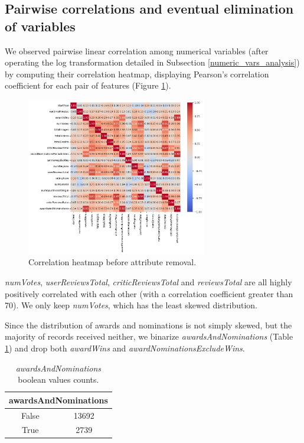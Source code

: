 \subsection{Pairwise correlations and eventual elimination of variables}
We observed pairwise linear correlation among numerical variables (after operating the log transformation detailed in Subsection \ref{numeric_vars_analysis}) by computing their correlation heatmap, displaying Pearson’s correlation coefficient for each pair of features (Figure \ref{fig:heatmap_first.png}).

\begin{figure}
    \centering
    \includegraphics[width=0.7\textwidth]{../../results/images/heatmap_first.png}
    \caption{Correlation heatmap before attribute removal.}
    \label{fig:heatmap_first.png}
\end{figure}


\textit{numVotes}, \textit{userReviewsTotal}, \textit{criticReviewsTotal} and \textit{reviewsTotal} are all highly positively correlated with each other (with a correlation coefficient greater than 70). We only keep \textit{numVotes}, which has the least skewed distribution.

Since the distribution of awards and nominations is not simply skewed, but the majority of records received neither, we binarize \textit{awardsAndNominations} (Table \ref{tab:awards_nominations_bool}) and drop both \textit{awardWins} and \textit{awardNominationsExcludeWins}.

\begin{table}[h]
    \centering
    \renewcommand{\arraystretch}{1}
    \begin{tabular}{|c|c|}
        \hline
        \multicolumn{2}{|c|}{\textbf{awardsAndNominations}} \\ \hline
        False & 13692 \\ \hline
        True  & 2739 \\ \hline
    \end{tabular}
    \caption{\textit{awardsAndNominations} boolean values counts.}
    \label{tab:awards_nominations_bool}
\end{table}

